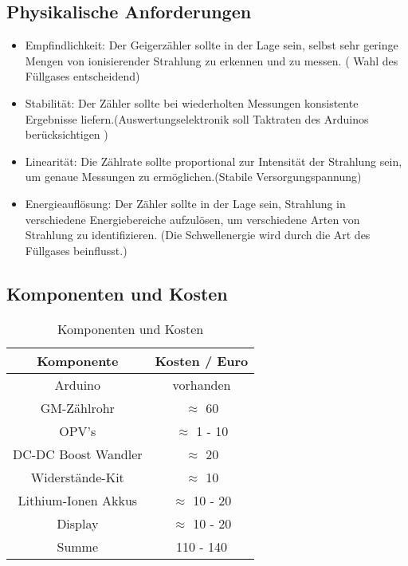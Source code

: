 \subsection*{Physikalische Anforderungen}
\begin{itemize}
    \item Empfindlichkeit: Der Geigerzähler sollte in der Lage sein, selbst sehr geringe Mengen von ionisierender Strahlung zu erkennen und zu messen. ( Wahl des Füllgases entscheidend)

    \item Stabilität: Der Zähler sollte bei wiederholten Messungen konsistente Ergebnisse liefern.(Auswertungselektronik soll Taktraten des Arduinos berücksichtigen )
    
    \item Linearität: Die Zählrate sollte proportional zur Intensität der Strahlung sein, um genaue Messungen zu ermöglichen.(Stabile Versorgungspannung)
    \item Energieauflösung: Der Zähler sollte in der Lage sein, Strahlung in verschiedene Energiebereiche aufzulösen, um verschiedene Arten von Strahlung zu identifizieren. (Die Schwellenergie wird durch die Art des Füllgases beinflusst.)
\end{itemize}

\subsection*{Komponenten und Kosten}
\begin{table}[H]
    \label{tab:eins}
    \centering
    \caption{Komponenten und Kosten}
    \begin{tabular}{cc} \hline
     Komponente& Kosten / Euro\\ \hline
     Arduino& vorhanden\\ \hline
     GM-Zählrohr& $\approx$ 60  \\ \hline
     OPV's& $\approx$ 1 - 10 \\ \hline
     DC-DC Boost Wandler& $\approx$ 20  \\ \hline
     Widerstände-Kit&$\approx$ 10 \\ \hline
     Lithium-Ionen Akkus & $\approx$ 10 - 20 \\ \hline
     Display & $\approx$ 10 - 20 \\ \hline \hline
     Summe & 110 - 140 \\ \hline
    \end{tabular}
    \end{table}
